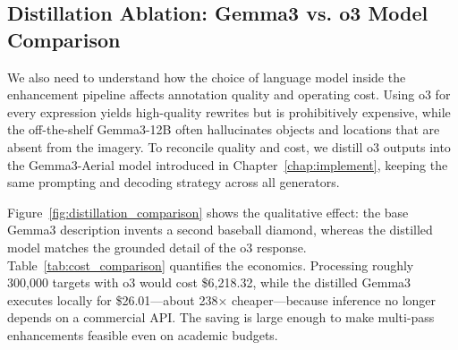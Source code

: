 \begin{table}[H]
\centering
\caption{Expression enhancement ablation across four datasets.}
\label{tab:ablation_expression_types}
\end{table}

\subsection{Distillation Ablation: Gemma3 vs. o3 Model Comparison}

We also need to understand how the choice of language model inside the enhancement pipeline affects annotation quality and operating cost. Using o3 for every expression yields high-quality rewrites but is prohibitively expensive, while the off-the-shelf Gemma3-12B often hallucinates objects and locations that are absent from the imagery. To reconcile quality and cost, we distill o3 outputs into the Gemma3-Aerial model introduced in Chapter~\ref{chap:implement}, keeping the same prompting and decoding strategy across all generators.

Figure~\ref{fig:distillation_comparison} shows the qualitative effect: the base Gemma3 description invents a second baseball diamond, whereas the distilled model matches the grounded detail of the o3 response. Table~\ref{tab:cost_comparison} quantifies the economics. Processing roughly 300{,}000 targets with o3 would cost \$6{,}218.32, while the distilled Gemma3 executes locally for \$26.01—about 238× cheaper—because inference no longer depends on a commercial API. The saving is large enough to make multi-pass enhancements feasible even on academic budgets.

